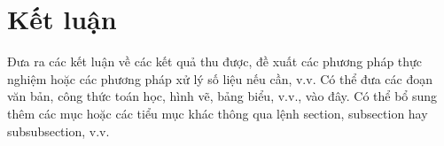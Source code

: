 \chapter*{Kết luận}
\label{ch:ketluan}

Đưa ra các kết luận về các kết quả thu được, đề xuất các phương pháp thực nghiệm hoặc các phương pháp xử lý số liệu nếu cần, v.v.
Có thể đưa các đoạn văn bản, công thức toán học, hình vẽ, bảng biểu, v.v., vào đây. Có thể bổ sung thêm các mục hoặc các tiểu mục khác thông qua lệnh section, subsection hay subsubsection, v.v.